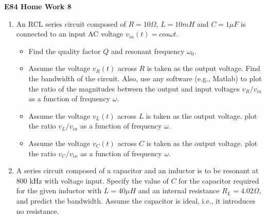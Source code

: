 \usepackage{html}

\begin{center}
{\Large \bf E84 Home Work 8}
\end{center}
\begin{enumerate}

\item An RCL series circuit composed of $R=10\Omega$, $L=10 mH$ and
$C=1 \mu F$ is connected to an input AC voltage $v_{in}(t)=cos\omega t$.
\begin{itemize}
\item Find the quality factor $Q$ and resonant frequency $\omega_0$.
\item Assume the voltage $v_R(t)$ across $R$ is taken as the output voltage.
  Find the bandwidth of the circuit. Also, use any software (e.g., Matlab) 
  to plot the ratio of the magnitudes between the output and input voltages 
  $v_R/v_{in}$ as a function of frequency $\omega$.
\item Assume the voltage $v_L(t)$ across $L$ is taken as the output voltage.
  plot the ratio $v_L/v_{in}$ as a function of frequency $\omega$.
\item Assume the voltage $v_C(t)$ across $C$ is taken as the output voltage.
  plot the ratio $v_C/v_{in}$ as a function of frequency $\omega$.
\end{itemize}


\item A series circuit composed of a capacitor and an inductor is to be 
resonant at 800 kHz with voltage input. Specify the value of $C$ for the 
capacitor required for the given inductor with $L=40\mu H$ and an internal 
resistance $R_L=4.02\Omega$, and predict the bandwidth. Assume the capacitor 
is ideal, i.e., it introduces no resistance.



\end{enumerate}
